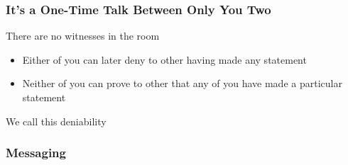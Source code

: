 \documentclass[
	aspectratio=169,
	xetex,
]{beamer}
\begin{document}
\begin{frame}
	\frametitle{It's a One-Time Talk Between Only You Two}
	There are no witnesses in the room
	\begin{itemize}
		\item Either of you can later deny to other having made any statement
		\item Neither of you can prove to other that any of you have made a particular statement
	\end{itemize}
	We call this \alert{deniability}
\end{frame}


\begin{frame}
	\frametitle{Messaging}
\end{frame}
\end{document}
